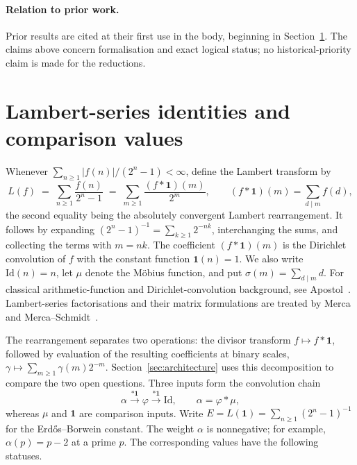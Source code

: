 \documentclass[11pt]{article}
\theoremstyle{definition}
\theoremstyle{remark}
\newcommand{\ph}{\varphi}
\begin{document}
\paragraph{Relation to prior work.}
Prior results are cited at their first use in the body, beginning in
Section~\ref{sec:ladder}.  The claims above concern formalisation and exact
logical status; no historical-priority claim is made for the reductions.

\section{Lambert-series identities and comparison values}\label{sec:ladder}

Whenever \(\sum_{n\ge1}|f(n)|/(2^n-1)<\infty\), define the Lambert transform by
\[
L(f)\;=\;\sum_{n\ge1}\frac{f(n)}{2^n-1}\;=\;\sum_{m\ge1}\frac{(f*\mathbf 1)(m)}{2^m},
\qquad (f*\mathbf 1)(m)=\sum_{d\mid m} f(d),
\]
the second equality being the absolutely convergent Lambert rearrangement.
It follows by expanding \((2^n-1)^{-1}=\sum_{k\geq1}2^{-nk}\), interchanging
the sums, and collecting the terms with \(m=nk\).  The coefficient
\((f*\mathbf 1)(m)\) is the Dirichlet convolution of \(f\) with the constant
function \(\mathbf 1(n)=1\).  We also write \(\mathrm{Id}(n)=n\), let \(\mu\)
denote the M\"obius function, and put \(\sigma(m)=\sum_{d\mid m}d\).
For classical arithmetic-function and Dirichlet-convolution background, see
Apostol~\cite{apostol}.  Lambert-series factorisations and their matrix
formulations are treated by Merca~\cite{merca2017} and
Merca--Schmidt~\cite{mercaschmidt}.

The rearrangement separates two operations: the divisor transform
\(f\mapsto f*\mathbf 1\), followed by evaluation of the resulting coefficients
at binary scales, \(\gamma\mapsto\sum_{m\ge1}\gamma(m)2^{-m}\).
Section~\ref{sec:architecture} uses this decomposition to compare the two open
questions.
Three inputs form the convolution chain
\[
 \alpha \xrightarrow{*\mathbf 1} \ph
 \xrightarrow{*\mathbf 1} \mathrm{Id},
 \qquad \alpha=\ph*\mu,
\]
whereas \(\mu\) and \(\mathbf 1\) are comparison inputs.  Write
\(E=L(\mathbf 1)=\sum_{n\ge1}(2^n-1)^{-1}\) for the Erd\H{o}s--Borwein
constant.  The weight \(\alpha\) is nonnegative; for example,
\(\alpha(p)=p-2\) at a prime \(p\).  The corresponding values have the
following statuses.
\end{document}
